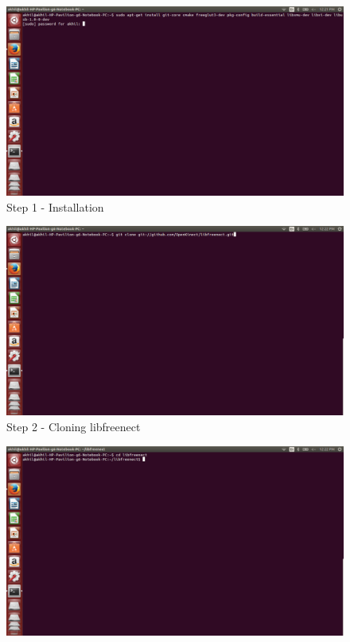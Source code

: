 \begin{flushleft}
\begin{itemize}
\end{itemize}
\begin{figure}
\begin{center}
\includegraphics[scale=0.35]{step1}
\end{center}
\caption{Step 1 - Installation}
\label{fig:w10}
\end{figure}
\medskip
\begin{figure}
\begin{center}
\includegraphics[scale=0.35]{step2}
\end{center}
\caption{Step 2 - Cloning libfreenect}
\label{fig:w11}
\end{figure}
\medskip
\begin{figure}
\begin{center}
\includegraphics[scale=0.35]{step3}

\end{center}
\end{figure}
\end{flushleft}
